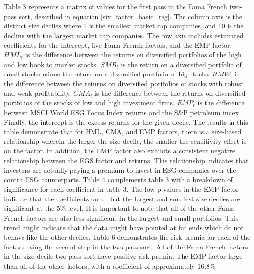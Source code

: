 Table 3 represents a matrix of values for the first pass in the Fama French two-pass sort, described in equation \eqref{six_factor_basic_reg}. The column axis is the distinct size deciles where 1 is the smallest market cap companies, and 10 is the decline with the largest market cap companies. The row axis includes estimated coefficients for the intercept, five Fama French factors, and the EMP factor. $HML_{t}$ is the difference between the returns on diversified portfolios of the high and low book to market stocks.  $SMB_{t}$ is the return on a diversified portfolio of small stocks minus the return on a diversified portfolio of big stocks. $RMW_t$ is the difference between the returns on diversified portfolios of stocks with robust and weak profitability. $CMA_{t}$ is the difference between the returns on diversified portfolios of the stocks of low and high investment firms. $EMP_t$ is the difference between MSCI World ESG Focus Index returns and the S\&P petroleum index. Finally, the intercept is the excess returns for the given decile. The results in this table demonstrate that for HML, CMA, and EMP factors, there is a size-based relationship wherein the larger the size decile, the smaller the sensitivity effect is on the factor. In addition, the EMP factor also exhibits a consistent negative relationship between the EGS factor and returns. This relationship indicates that investors are actually paying a premium to invest in ESG companies over the contra ESG counterparts. Table 4 complements table 3 with a breakdown of significance for each coefficient in table 3. The low p-values in the EMP factor indicate that the coefficients on all but the largest and smallest size deciles are significant at the 5\% level. It is important to note that all of the other Fama French factors are also less significant In the largest and small portfolios. This trend might indicate that the data might have pointed at far ends which do not behave like the other deciles.  Table 6 demonstrates the risk premia for each of the factors using the second step in the two-pass sort. All of the Fama French factors in the size decile two-pass sort have positive risk premia. The EMP factor large than all of the other factors, with a coefficient of approximately  16.8\%




